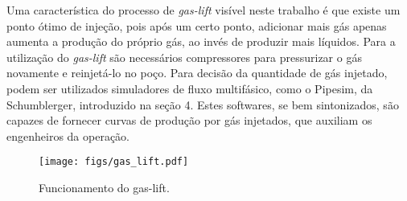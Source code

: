 Uma característica do processo de \textit{gas-lift} visível neste trabalho é que existe um ponto ótimo de injeção, pois após um certo ponto, adicionar mais gás apenas aumenta a produção do próprio gás, ao invés de produzir mais líquidos.
%
Para a utilização do \textit{gas-lift} são necessários compressores para pressurizar o gás novamente e reinjetá-lo no poço.
%
Para decisão da quantidade de gás injetado, podem ser utilizados simuladores de fluxo multifásico, como o Pipesim, da Schumblerger, introduzido na seção 4. Estes softwares, se bem sintonizados, são capazes de fornecer curvas de produção por gás injetados, que auxiliam os engenheiros da operação.



\begin{figure}
\centering
	  \texttt{[image: figs/gas\_lift.pdf]}
  \caption{Funcionamento do gas-lift.}
  \label{fig:setup3_triang}
\end{figure}

